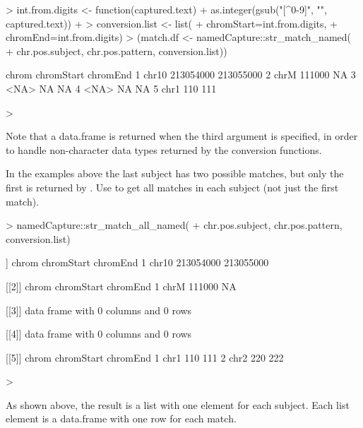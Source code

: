 \begin{Schunk}
\begin{Sinput}
> int.from.digits <- function(captured.text){
+   as.integer(gsub("[^0-9]", "", captured.text))
+ }
> conversion.list <- list(
+   chromStart=int.from.digits,
+   chromEnd=int.from.digits)
> (match.df <- namedCapture::str_match_named(
+   chr.pos.subject, chr.pos.pattern, conversion.list))
\end{Sinput}
\begin{Soutput}
  chrom chromStart  chromEnd
1 chr10  213054000 213055000
2  chrM     111000        NA
3  <NA>         NA        NA
4  <NA>         NA        NA
5  chr1        110       111
\end{Soutput}
\begin{Sinput}
> 
\end{Sinput}
\end{Schunk}

Note that a data.frame is returned when the third argument is
specified, in order to handle non-character data types returned by the
conversion functions.

In the examples above the last subject has two possible
matches, but only the first is returned by . Use
 to get all matches in each subject (not just the
first match).

\begin{Schunk}
\begin{Sinput}
> namedCapture::str_match_all_named(
+   chr.pos.subject, chr.pos.pattern, conversion.list)
\end{Sinput}
\begin{Soutput}
[[1]]
  chrom chromStart  chromEnd
1 chr10  213054000 213055000

[[2]]
  chrom chromStart chromEnd
1  chrM     111000       NA

[[3]]
data frame with 0 columns and 0 rows

[[4]]
data frame with 0 columns and 0 rows

[[5]]
  chrom chromStart chromEnd
1  chr1        110      111
2  chr2        220      222
\end{Soutput}
\begin{Sinput}
> 
\end{Sinput}
\end{Schunk}

As shown above, the result is a list with one element for
each subject. Each list element is a data.frame with one row for each
match.


